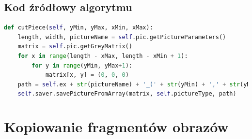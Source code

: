 \documentclass[a4paper,12pt, titlepage]{report}
\begin{document}
\subsection*{Kod źródłowy algorytmu}
\begin{lstlisting}[language=Python]
def cutPiece(self, yMin, yMax, xMin, xMax):
    length, width, pictureName = self.pic.getPictureParameters()
    matrix = self.pic.getGreyMatrix()
    for x in range(length - xMax, length - xMin + 1):
        for y in range(yMin, yMax+1):
            matrix[x, y] = (0, 0, 0)
    path = self.ex + str(pictureName) + '_(' + str(yMin) + ',' + str(yMax) + '),(' + str(xMin) + ',' + str(xMax) + ').png'
    self.saver.savePictureFromArray(matrix, self.pictureType, path)
\end{lstlisting}

\section{Kopiowanie fragmentów obrazów}
\end{document}
